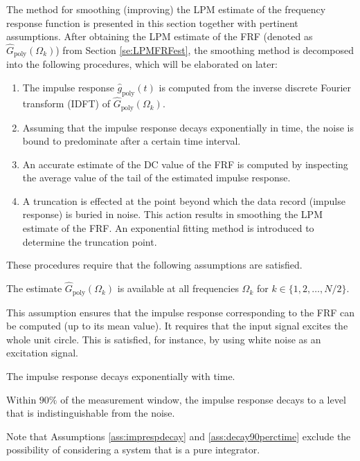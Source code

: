 
The method for smoothing (improving) the LPM estimate of the frequency response function  is presented in this section together with pertinent assumptions. After obtaining the LPM estimate of the FRF (denoted as $\hat{G}_{\mathrm{poly}}(\Omega_k)$) from Section \ref{se:LPMFRFest}, the smoothing method is decomposed into the following procedures, which will be elaborated on later:
\begin{enumerate}
\item The impulse response $\hat g_\mathrm{poly}(t)$  is computed from the inverse discrete Fourier transform (IDFT) of $\hat{G}_{\mathrm{poly}}(\Omega_k)$.

\item
Assuming that the impulse response decays exponentially in time, the noise is bound to predominate after a certain time interval. 

\item
An accurate estimate of the DC value of the FRF is computed by inspecting the average value of the tail of the estimated impulse response.

\item
A truncation is effected at the point beyond which the data record (impulse response) is buried in noise. 
This action results in smoothing the LPM estimate of the FRF. An exponential fitting method is introduced to determine the truncation point.
\end{enumerate}


These procedures require that the following assumptions are satisfied.

\begin{assumption}
The estimate $\hat G_\mathrm{poly}(\Omega_k)$ is available at all frequencies $\Omega_k$ for $k\in\{1,2,\dots,N/2\}$.
\end{assumption}

This assumption ensures that the impulse response corresponding to the FRF can be computed (up to its mean value). It requires that the input signal excites the whole unit circle. This is satisfied, for instance, by using white noise as an excitation signal.

\begin{assumption}\label{ass:imprespdecay}
The impulse response decays exponentially with time.
\end{assumption}

\begin{assumption}\label{ass:decay90perctime}
Within $90\%$ of the measurement window, the impulse response decays 
 to a level that is indistinguishable from the noise. 
\end{assumption}

Note that Assumptions \ref{ass:imprespdecay} and \ref{ass:decay90perctime} exclude the possibility of considering a system that is a pure integrator.
